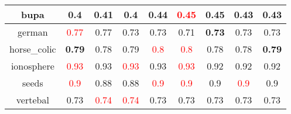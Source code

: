 \documentclass{article}%
\begin{document}
\begin{tabular}{c|cccccccc}
\hline%
bupa&0.4&\textbf{0.41}&0.4&\textbf{0.44}&\textcolor{red}{ 
0.45
}&0.45&0.43&0.43\\%
\hline%
german&\textcolor{red}{ 
0.77
}&0.77&0.73&0.73&0.71&\textbf{0.73}&0.73&0.73\\%
\hline%
horse\_colic&\textbf{0.79}&0.78&0.79&\textcolor{red}{ 
0.8
}&\textcolor{red}{ 
0.8
}&0.78&0.78&\textbf{0.79}\\%
\hline%
ionosphere&\textcolor{red}{ 
0.93
}&0.93&\textcolor{red}{ 
0.93
}&0.93&\textcolor{red}{ 
0.93
}&0.92&0.92&0.92\\%
\hline%
seeds&\textcolor{red}{ 
0.9
}&0.88&0.88&\textcolor{red}{ 
0.9
}&\textcolor{red}{ 
0.9
}&0.9&\textcolor{red}{ 
0.9
}&0.9\\%
\hline%
vertebal&0.73&\textcolor{red}{ 
0.74
}&\textcolor{red}{ 
0.74
}&0.73&0.73&0.73&0.73&0.73\\%
\hline%
\end{tabular}

%
\end{document}
